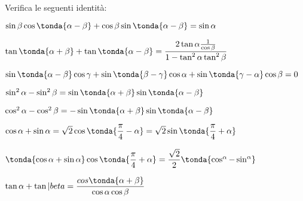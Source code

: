 \subsubsection*{}

\begin{esercizio}\label{ese:03.1}
Verifica le seguenti identità:
 \begin{enumeratea}
  \item $\sin \beta \cos \tonda{\alpha - \beta} +
         \cos \beta \sin \tonda{\alpha - \beta} = \sin \alpha$
  \item $\tan \tonda{\alpha + \beta} + \tan \tonda{\alpha - \beta} =
         \dfrac{2 \tan \alpha \frac{1}{\cos \beta}}
               {1- \tan^2 \alpha \tan^2 \beta}$
  \item $\sin \tonda{\alpha - \beta} \cos \gamma +
         \sin \tonda{\beta - \gamma} \cos \alpha +
         \sin \tonda{\gamma - \alpha} \cos \beta = 0$
  \item $\sin^2 \alpha  - \sin^2 \beta = 
         \sin \tonda{\alpha + \beta} \sin \tonda{\alpha - \beta}$
  \item $\cos^2 \alpha  - \cos^2 \beta = 
         - \sin \tonda{\alpha + \beta} \sin \tonda{\alpha - \beta}$
  \item $\cos \alpha + \sin \alpha = 
  \sqrt{2} \cos \tonda{\dfrac{\pi}{4} - \alpha} = 
  \sqrt{2} \sin \tonda{\dfrac{\pi}{4} + \alpha}$
  \item $\tonda{\cos \alpha + \sin \alpha} 
         \cos \tonda{\dfrac{\pi}{4} + \alpha} =
         \dfrac{\sqrt{2}}{2} \tonda{\cos^ \alpha - \sin^ \alpha}$
  \item $\tan \alpha + \tan |beta =
         \dfrac{cos \tonda{\alpha + \beta}}{\cos \alpha \cos \beta}$
 \end{enumeratea}
\end{esercizio}

\subsubsection*{}

